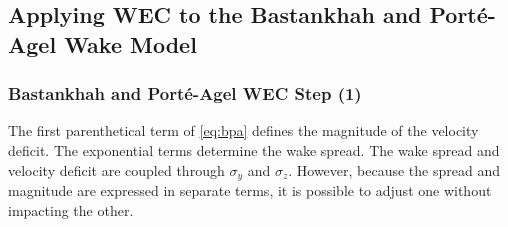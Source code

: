 \documentclass{jpconf}
\begin{document}
\subsection{Applying WEC to the Bastankhah and Port\'e-Agel Wake Model}

\subsubsection{Bastankhah and Port\'e-Agel WEC Step (1)}
The first parenthetical term of \cref{eq:bpa} defines the magnitude of the velocity deficit. The exponential terms determine the wake spread. The wake spread and velocity deficit are coupled through $\sigma_y$ and $\sigma_z$. However, because the spread and magnitude are expressed in separate terms, it is possible to adjust one without impacting the other. 
\end{document}
